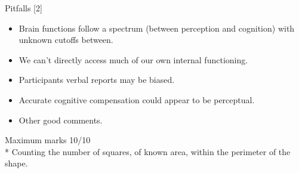 \documentclass[12pt,english]{scrartcl}
\begin{document}
\begin{enumerate}
 \color{blue}
 Pitfalls [2]
 \begin{itemize}
 \item Brain functions follow a spectrum (between perception and cognition) with unknown cutoffs between.
 \item We can't directly access much of our own internal functioning.
 \item Participants verbal reports may be biased.
 \item Accurate cognitive compensation could appear to be perceptual.
 \item Other good comments.
 \end{itemize}


 \end{enumerate}

 Maximum marks 10/10 \\
 * Counting the number of squares, of known area, within the perimeter of the shape.
\end{document}
